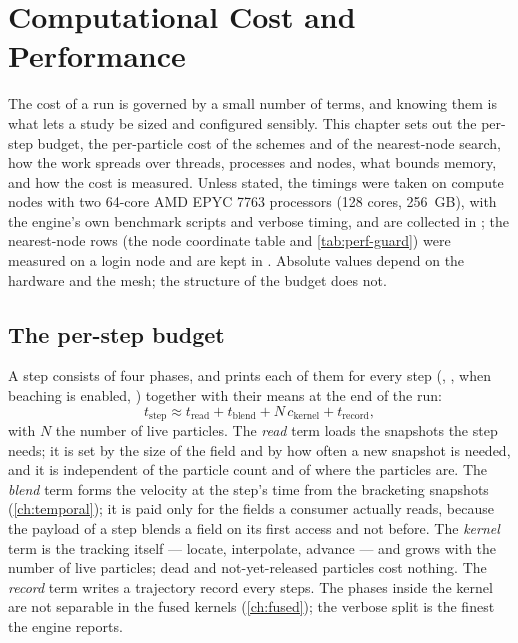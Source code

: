 \chapter{Computational Cost and Performance}\label{ch:performance}

The cost of a run is governed by a small number of terms, and knowing them is what lets a study be
sized and configured sensibly. This chapter sets out the per-step budget, the per-particle cost of
the schemes and of the nearest-node search, how the work spreads over threads, processes and nodes,
what bounds memory, and how the cost is measured. Unless stated, the timings were taken on compute nodes
with two 64-core AMD EPYC 7763 processors (128 cores, \SI{256}{GB}), with the engine's own benchmark
scripts and verbose timing, and are collected in ; the nearest-node rows
(the node coordinate table and \cref{tab:perf-guard}) were measured on a login node and are kept in
. Absolute
values depend on the hardware and the mesh; the structure of the budget does not.

\section{The per-step budget}\label{sec:perf-model}

A step consists of four phases, and  prints each of them for every step
(, ,  when beaching is enabled, ) together with their
means at the end of the run:
\begin{equation}\label{eq:perf-model}
  t_{\text{step}} \approx t_{\text{read}} + t_{\text{blend}} + N\,c_{\text{kernel}} + t_{\text{record}},
\end{equation}
with $N$ the number of live particles. The \emph{read} term loads the snapshots the step needs; it
is set by the size of the field and by how often a new snapshot is needed, and it is independent of
the particle count and of where the particles are. The \emph{blend} term forms the velocity at the
step's time from the bracketing snapshots (\cref{ch:temporal}); it is paid only for the fields a
consumer actually reads, because the payload of a step blends a field on its first access and not
before. The \emph{kernel} term is the tracking itself --- locate, interpolate, advance --- and grows
with the number of live particles; dead and not-yet-released particles cost nothing. The
\emph{record} term writes a trajectory record every  steps. The phases inside the
kernel are not separable in the fused kernels (\cref{ch:fused}); the verbose split is the finest
the engine reports.

